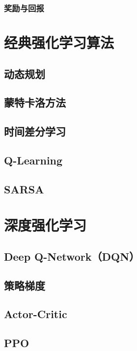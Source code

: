 \documentclass[12pt,UTF8]{ctexbook}
\begin{document}
\subsection{奖励与回报}

\chapter{经典强化学习算法}
\label{chap:classic_rl}

\section{动态规划}

\section{蒙特卡洛方法}

\section{时间差分学习}

\section{Q-Learning}

\section{SARSA}

\chapter{深度强化学习}
\label{chap:deep_rl}

\section{Deep Q-Network（DQN）}

\section{策略梯度}

\section{Actor-Critic}

\section{PPO}
\end{document}
